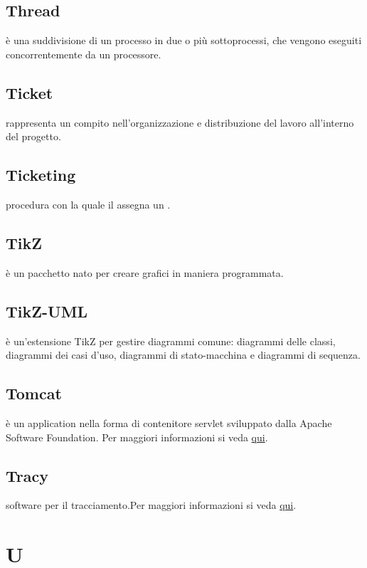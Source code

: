 \documentclass[12pt,a4paper]{article}
\begin{document}
\subsection{Thread} 
è una suddivisione di un processo in due o più sottoprocessi, che vengono eseguiti concorrentemente da un processore.

\subsection{Ticket} 
rappresenta un compito nell'organizzazione e distribuzione del lavoro all'interno del progetto.

\subsection{Ticketing} 
procedura con la quale il \RE assegna un .

\subsection{TikZ} 
è un pacchetto  nato per creare grafici in maniera programmata.

\subsection{TikZ-UML} 
è un'estensione TikZ per gestire diagrammi  comune: diagrammi delle classi, diagrammi dei casi d'uso, diagrammi di stato-macchina e diagrammi di sequenza.

\subsection{Tomcat} 
è un application  nella forma di contenitore servlet  sviluppato dalla Apache Software Foundation. Per maggiori informazioni si veda \href{https://it.wikipedia.org/wiki/Apache_Tomcat}{qui}.

\subsection{Tracy} 
software  per il tracciamento.Per maggiori informazioni si veda \href{http://tracy-tpiga.rhcloud.com/tracy/}{qui}.


\newpage

\section{U}
\end{document}
